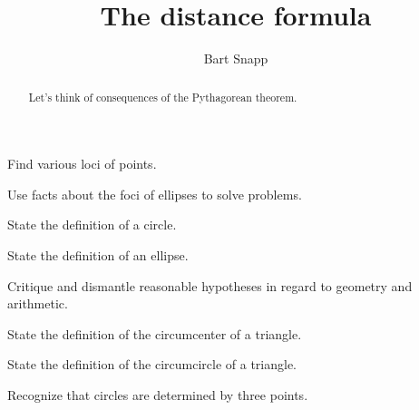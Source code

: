 \documentclass[nooutcomes,noauthor]{ximera}
\title{The distance formula}
\author{Bart Snapp}
\begin{document}
\begin{abstract}
  Let's think of consequences of the Pythagorean theorem.
\end{abstract}
\maketitle


\begin{listOutcomes}
\item Find various loci of points.
\item Use facts about the foci of ellipses to solve problems.
\item State the definition of a circle.
\item State the definition of an ellipse.
\item{Critique and dismantle reasonable hypotheses in regard to geometry and arithmetic.}
\item State the definition of the circumcenter of a triangle.
\item State the definition of the circumcircle of a triangle.
\item Recognize that circles are determined by three points.
\end{listOutcomes}


\mynewpage
\end{document}
